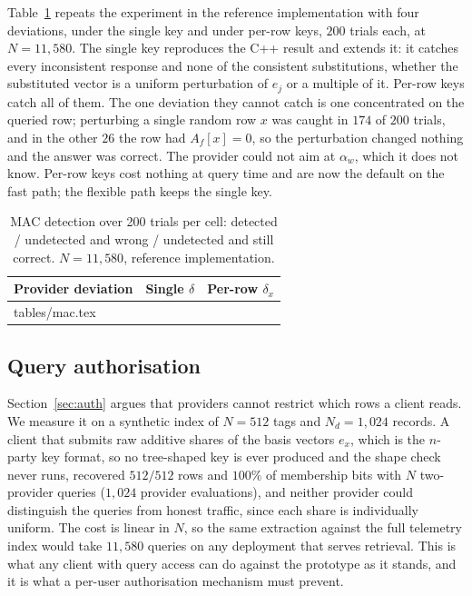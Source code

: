 \documentclass[a4paper,fleqn]{cas-dc}
\begin{document}
Table~\ref{tab:mac} repeats the experiment in the reference implementation
with four deviations, under the single key and under per-row keys, $200$
trials each, at $N=11{,}580$. The single key reproduces the C++ result and
extends it: it catches every inconsistent response and none of the consistent
substitutions, whether the substituted vector is a uniform perturbation of
$e_j$ or a multiple of it. Per-row keys catch all of them. The one deviation
they cannot catch is one concentrated on the queried row; perturbing a single
random row $x$ was caught in $174$ of $200$ trials, and in the other $26$ the
row had $A_f[x]=0$, so the perturbation changed nothing and the answer was
correct. The provider could not aim at $\alpha_w$, which it does not know.
Per-row keys cost nothing at query time and are now the default on the fast
path; the flexible path keeps the single key.

\begin{table}[pos=t]
\caption{MAC detection over 200 trials per cell: detected / undetected and
wrong / undetected and still correct. $N=11{,}580$, reference
implementation.}
\label{tab:mac}
\centering
\footnotesize
\setlength{\tabcolsep}{3pt}
\begin{tabular*}{\tblwidth}{@{\extracolsep{\fill}}lcc@{}}
\toprule
Provider deviation & Single $\delta$ & Per-row $\delta_x$ \\
\midrule
{} tables/mac.tex 
\bottomrule
\end{tabular*}
\end{table}

\subsection{Query authorisation}
\label{sec:authresult}
Section~\ref{sec:auth} argues that providers cannot restrict which rows a
client reads. We measure it on a synthetic index of $N=512$ tags and
$N_d=1{,}024$ records. A client that submits raw additive shares of the basis
vectors $e_x$, which is the $n$-party key format, so no tree-shaped key is
ever produced and the shape check never runs, recovered $512/512$ rows and
$100\%$ of membership bits with $N$ two-provider queries ($1{,}024$ provider
evaluations), and neither provider could distinguish the queries from honest
traffic, since each share is individually uniform. The cost is linear in $N$,
so the same extraction against the full telemetry index would take $11{,}580$
queries on any deployment that serves retrieval. This is what any client with
query access can do against the prototype as it stands, and it is what a
per-user authorisation mechanism must prevent.
\end{document}
